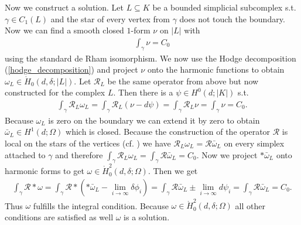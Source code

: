 \documentclass[12pt,a4paper]{article}
\theoremstyle{definition}
\newcommand{\rop}{\mathscr{R}} %
\begin{document}
Now we construct a solution. Let $L \subseteq K$ be a bounded
simplicial subcomplex s.t. $\gamma \in C_1(L)$ and the star of 
every vertex from $\gamma$ does not touch the boundary. Now we can 
find a smooth closed $1$-form $\nu$ on $|L|$ with 
\begin{align*}
    \int_\gamma \nu = C_0
\end{align*}
using the standard de Rham isomorphism. We now use the Hodge decomposition
(\ref{hodge_decomposition}) and project $\nu$ onto the harmonic functions 
to obtain $\omega_L \in \mathring{H}_0(d,\delta;|L|)$. Let 
$\rop_L$ be the same operator from above but now constructed for the 
complex $L$. Then there is a $\psi \in H^0(d;|K|)$ s.t.
\begin{align*}
    \int_\gamma \rop_L \omega_L = \int_\gamma \rop_L (\nu - d\psi) =
    \int_\gamma \rop_L \nu = \int_\gamma \nu = C_0.
\end{align*}
Because $\omega_L$ is zero on the boundary we can extend it by zero to 
obtain $\bar{\omega}_L \in H^1(d;\Omega)$ which is closed. 
Because the construction of the operator $\rop$ is local on the stars 
of the vertices
(cf. \cite{goldshtein}) we have $\rop_L \omega_L = \rop \bar{\omega}_L$ on 
every simplex attached to $\gamma$ and therefore 
$\int_\gamma \rop_L \omega_L = \int_\gamma \rop \bar{\omega}_L = C_0$. 
Now we project $*\bar{\omega}_L$ onto harmonic forms to get 
$\omega \in \mathring{H}^2_0(d,\delta;\Omega)$. Then we get
\begin{align*}
    \int_\gamma \rop * \omega = \int_\gamma \rop *(*\bar{\omega}_L - 
    \lim\limits_{i \rightarrow \infty}\delta \phi_i) = 
    \int_\gamma \rop \bar{\omega}_L \pm 
    \lim\limits_{i \rightarrow \infty}d \psi_i = 
    \int_\gamma \rop \bar{\omega}_L = C_0.
\end{align*}
Thus $\omega$ fulfills the integral condition. 
Because $\omega \in \mathring{H}^2_0(d,\delta;\Omega)$ all other conditions 
are satisfied as well $\omega$ is a solution.


\end{document}
